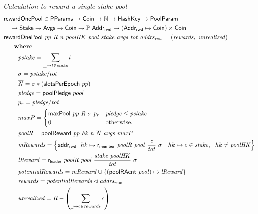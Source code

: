 \begin{figure}[htb]
  \emph{Calculation to reward a single stake pool}
  \begin{align*}
      & \fun{rewardOnePool} \in \PParams \to \Coin \to \N \to \HashKey \to \PoolParam\\
      & ~~~\to \Stake \to \Avgs \to \Coin \to \powerset{\AddrRWD}
           \to (\AddrRWD \mapsto \Coin)\times\Coin \\
      & \rewardOnePool{pp}{R}{n}{poolHK}{pool}{stake}{avgs}{tot}{addrs_{rew}} =
          (\var{rewards},~\var{unrealized})\\
      & ~~~\where \\
      & ~~~~~~~\var{pstake} = \sum_{\_\mapsto t\in\var{stake}} t \\
      & ~~~~~~~\sigma = \var{pstake} / tot \\
      & ~~~~~~~\var{\overline{N}} = \sigma * (\fun{slotsPerEpoch}~{pp})\\
      & ~~~~~~~\var{pledge} = \fun{poolPledge}~pool \\
      & ~~~~~~~p_{r} = \var{pledge} / \var{tot} \\
      & ~~~~~~~maxP =
      \begin{cases}
        \fun{maxPool}~\var{pp}~\var{R}~\sigma~\var{p_r}&
        \var{pledge} \leq \var{pstake}\\
        0 & \text{otherwise.}
      \end{cases} \\
      & ~~~~~~~\var{poolR} = \poolReward{pp}{hk}{n}{\overline{N}}{avgs}{maxP} \\
      & ~~~~~~~\var{mRewards} = \left\{
                                  \addrRw~hk\mapsto\mReward{poolR}{pool}{\frac{c}{tot}}{\sigma}
                                  ~\Big\vert~
                                  hk\mapsto c\in\var{stake},~~hk \neq\var{poolHK}
                               \right\}\\
      & ~~~~~~~\var{lReward} = \lReward{poolR}{pool}{\frac{\var{stake}~\var{poolHK}}{tot}}{\sigma} \\
      & ~~~~~~~\var{potentialRewards} =
                 \var{mReward} \cup
                 \{(\fun{poolRAcnt}~\var{pool})\mapsto\var{lReward}\} \\
      & ~~~~~~~\var{rewards} = \var{potentialRewards}\restrictdom{\var{addrs_{rew}}} \\
      & ~~~~~~~\var{unrealized} = R - \left(\sum_{\wcard\mapsto c\in\var{rewards}} c\right) \\
  \end{align*}


\end{figure}
